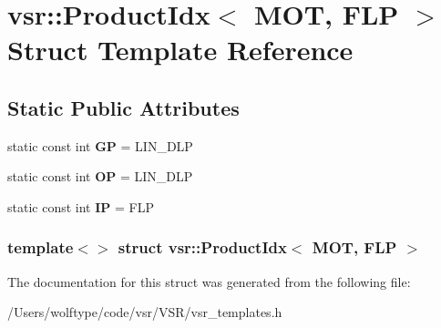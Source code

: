 \hypertarget{structvsr_1_1_product_idx_3_01_m_o_t_00_01_f_l_p_01_4}{\section{vsr\-:\-:Product\-Idx$<$ M\-O\-T, F\-L\-P $>$ Struct Template Reference}
\label{structvsr_1_1_product_idx_3_01_m_o_t_00_01_f_l_p_01_4}
}
\subsection*{Static Public Attributes}
\begin{DoxyCompactItemize}
\item 
\hypertarget{structvsr_1_1_product_idx_3_01_m_o_t_00_01_f_l_p_01_4_a8e0ef1fc0089da91aa70bbe3c60e528f}{static const int {\bfseries G\-P} = L\-I\-N\-\_\-\-D\-L\-P}\label{structvsr_1_1_product_idx_3_01_m_o_t_00_01_f_l_p_01_4_a8e0ef1fc0089da91aa70bbe3c60e528f}

\item 
\hypertarget{structvsr_1_1_product_idx_3_01_m_o_t_00_01_f_l_p_01_4_a28c1a8d6d14ddf833318b8073970856c}{static const int {\bfseries O\-P} = L\-I\-N\-\_\-\-D\-L\-P}\label{structvsr_1_1_product_idx_3_01_m_o_t_00_01_f_l_p_01_4_a28c1a8d6d14ddf833318b8073970856c}

\item 
\hypertarget{structvsr_1_1_product_idx_3_01_m_o_t_00_01_f_l_p_01_4_a16ed1d5fdc329864d6be9d36958e79e0}{static const int {\bfseries I\-P} = F\-L\-P}\label{structvsr_1_1_product_idx_3_01_m_o_t_00_01_f_l_p_01_4_a16ed1d5fdc329864d6be9d36958e79e0}

\end{DoxyCompactItemize}
\subsubsection*{template$<$$>$ struct vsr\-::\-Product\-Idx$<$ M\-O\-T, F\-L\-P $>$}



The documentation for this struct was generated from the following file\-:\begin{DoxyCompactItemize}
\item 
/\-Users/wolftype/code/vsr/\-V\-S\-R/vsr\-\_\-templates.\-h\end{DoxyCompactItemize}
